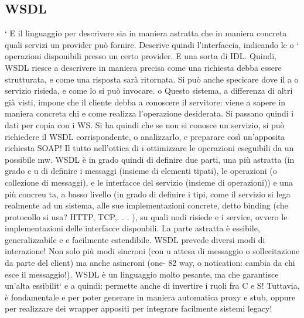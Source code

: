 \subsection{WSDL}
`
E il linguaggio per descrivere sia in maniera astratta che in maniera concreta
quali servizi un provider può fornire. Descrive quindi l'interfaccia, indicando le
o
`
operazioni disponibili presso un certo provider. E una sorta di IDL. Quindi,
WSDL riesce a descrivere in maniera precisa come una richiesta debba essere
strutturata, e come una risposta sarà ritornata. Si può anche specicare dove il
a
o
servizio risieda, e come lo si può invocare.
o
Questo sistema, a differenza di altri già visti, impone che il cliente debba
a
conoscere il servitore: viene a sapere in maniera concreta chi e come realizza
l'operazione desiderata. Si passano quindi i dati per copia con i WS. Si ha quindi che se non si conosce un servizio, si
può richiedere il WSDL corrispondente,
o
analizzarlo, e preparare così un'apposita richiesta SOAP! Il tutto nell'ottica di
\i{}
ottimizzare le operazioni eseguibili da un possibile mw.
WSDL è in grado quindi di definire due parti, una più astratta (in grado
e
u
di definire i messaggi (insieme di elementi tipati), le operazioni (o collezione di
messaggi), e le interfacce del servizio (insieme di operazioni)) e una più concreu
ta, a basso livello (in grado di definire i tipi, come il servizio si lega realmente
ad un sistema, alle sue implementazioni concrete, detto binding (che protocollo
si usa? HTTP, TCP,. . . ), su quali nodi risiede e i service, ovvero le implementazioni delle interfacce disponbili. La
parte astratta è essibile, generalizzabile
e
e facilmente estendibile.
WSDL prevede diversi modi di interazione! Non solo più modi sincroni (con
u
attesa di messaggio o sollecitazione da parte del client) ma anche asincroni (one-
82
way, o notication: cambia da chi esce il messaggio!).
WSDL è un linguaggio molto pesante, ma che garantisce un'alta essibilit`
e
a
quindi: permette anche di invertire i ruoli fra C e S! Tuttavia, è fondamentale
e
per poter generare in maniera automatica proxy e stub, oppure per realizzare
dei wrapper appositi per integrare facilmente sistemi legacy!
